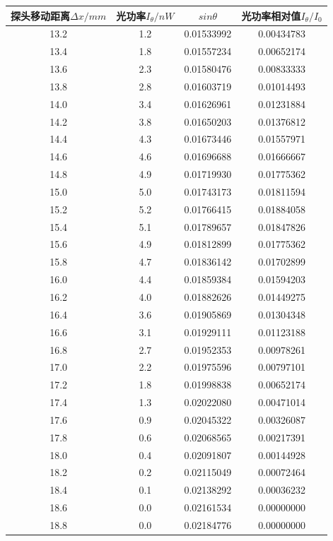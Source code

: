 \documentclass[12pt,a4paper,UTF8]{ctexart}
\begin{document}
\begin{table}[htbp]
\centering
\begin{longtable}{cccc}
\toprule
探头移动距离$\varDelta x/mm$ & 光功率$I_\theta/nW$ &$sin\theta $ &光功率相对值$I_\theta/I_0 $\\
\midrule


	13.2&1.2&0.01533992&0.00434783 \\
	13.4&1.8&0.01557234&0.00652174 \\
	13.6&2.3&0.01580476&0.00833333 \\
	13.8&2.8&0.01603719&0.01014493 \\
	14.0&3.4&0.01626961&0.01231884 \\
	14.2&3.8&0.01650203&0.01376812 \\
	14.4&4.3&0.01673446&0.01557971 \\
	14.6&4.6&0.01696688&0.01666667 \\
	14.8&4.9&0.01719930&0.01775362 \\
	15.0&5.0&0.01743173&0.01811594 \\
	15.2&5.2&0.01766415&0.01884058 \\
	15.4&5.1&0.01789657&0.01847826 \\
	15.6&4.9&0.01812899&0.01775362 \\
	15.8&4.7&0.01836142&0.01702899 \\
	16.0&4.4&0.01859384&0.01594203 \\
	16.2&4.0&0.01882626&0.01449275 \\
	16.4&3.6&0.01905869&0.01304348 \\
	16.6&3.1&0.01929111&0.01123188 \\
	16.8&2.7&0.01952353&0.00978261 \\
	17.0&2.2&0.01975596&0.00797101 \\
	17.2&1.8&0.01998838&0.00652174 \\
	17.4&1.3&0.02022080&0.00471014 \\
	17.6&0.9&0.02045322&0.00326087 \\
	17.8&0.6&0.02068565&0.00217391 \\
	18.0&0.4&0.02091807&0.00144928 \\
	18.2&0.2&0.02115049&0.00072464 \\
	18.4&0.1&0.02138292&0.00036232 \\
	18.6&0.0&0.02161534&0.00000000 \\
	18.8&0.0&0.02184776&0.00000000 \\
	\bottomrule
	\end{longtable}%
	\label{tab:data2}%
\end{table}%
\end{document}
